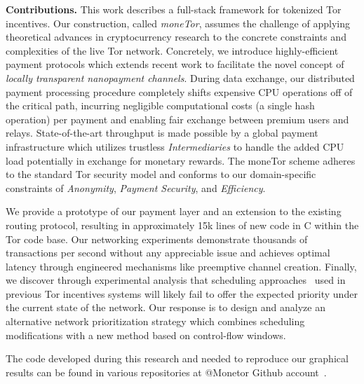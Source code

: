 \label{sec:Contributions}
\noindent \textbf{Contributions.} This work describes a full-stack framework for tokenized
Tor incentives. Our construction, called \emph{moneTor}, assumes the challenge
of applying theoretical advances in cryptocurrency research to the concrete
constraints and complexities of the live Tor network. Concretely, we introduce
highly-efficient payment protocols which extends recent work to facilitate the
novel concept of \emph{locally transparent nanopayment channels}. During data
exchange, our distributed payment processing procedure completely shifts
expensive CPU operations off of the critical path, incurring negligible
computational costs (a single hash operation) per payment and enabling fair
exchange between premium users and relays. State-of-the-art throughput is made
possible by a global payment infrastructure which utilizes trustless
\emph{Intermediaries} to handle the added CPU load potentially in exchange for
monetary rewards. The moneTor scheme adheres to the standard Tor security model
and conforms to our domain-specific constraints of \emph{Anonymity},
\emph{Payment Security}, and \emph{Efficiency}.

We provide a prototype of our payment layer and an extension to the existing
routing protocol, resulting in approximately 15k lines of new code in C within
the Tor code base. Our networking experiments demonstrate thousands of
transactions per second without any appreciable issue and achieves optimal
latency through engineered mechanisms like preemptive channel creation. Finally,
we discover through experimental analysis that scheduling
approaches~\cite{dovrolis1999case, tang2010improved} used in previous Tor
incentives systems will likely fail to offer the expected priority under the
current state of the network. Our response is to design and analyze an
alternative network prioritization strategy which combines scheduling
modifications with a new method based on control-flow windows.

The code developed during this research and needed to reproduce our
graphical results can be found in various repositories at @Monetor
Github account~\cite{monetor-github}.


